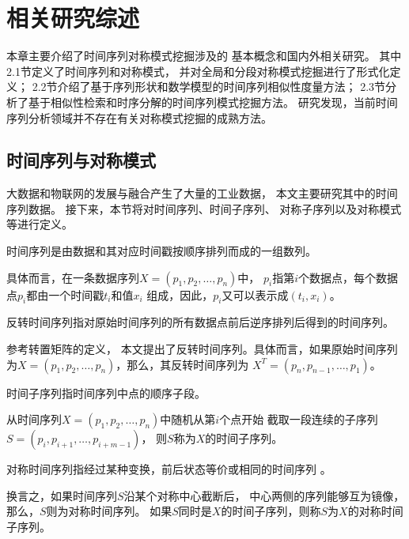 
\chapter{相关研究综述}
本章主要介绍了时间序列对称模式挖掘涉及的
基本概念和国内外相关研究。
其中2.1节定义了时间序列和对称模式，
并对全局和分段对称模式挖掘进行了形式化定义；
2.2节介绍了基于序列形状和数学模型的时间序列相似性度量方法；
2.3节分析了基于相似性检索和时序分解的时间序列模式挖掘方法。
研究发现，当前时间序列分析领域并不存在有关对称模式挖掘的成熟方法。

\section{时间序列与对称模式}
大数据和物联网的发展与融合产生了大量的工业数据，
本文主要研究其中的时间序列数据。
接下来，本节将对时间序列、时间子序列、
对称子序列以及对称模式等进行定义。

\begin{definition}
  时间序列是由数据和其对应时间戳按顺序排列而成的一组数列\cite{DBLP:journals/csur/EslingA12}。

  具体而言，在一条数据序列$X = \left( p_1,p_2,\dots,p_n \right)$中，
  $p_i$指第$i$个数据点，每个数据点$p_i$都由一个时间戳$t_i$和值$x_i$
  组成，因此，$p_i$又可以表示成$\left( t_i,x_i \right)$。
\end{definition}

\begin{definition}
  反转时间序列指对原始时间序列的所有数据点前后逆序排列后得到的时间序列。

  参考转置矩阵的定义\cite{DBLP:conf/vecpar/HishinumaHT16}，
  本文提出了反转时间序列。具体而言，如果原始时间序列
  为$X = \left( p_1,p_2,\dots,p_n \right)$，那么，其反转时间序列为
  $X^T = \left( p_n,p_{n-1},\dots,p_1 \right)$。
\end{definition}

\begin{definition}
  时间子序列指时间序列中点的顺序子段\cite{DBLP:conf/pakdd/LinM10}。

  从时间序列$X=\left( p_1,p_2,\dots,p_n \right)$中随机从第$i$个点开始
  截取一段连续的子序列$S = \left( p_i,p_{i+1},\dots,p_{i+m-1} \right)$，
  则$S$称为$X$的时间子序列。 
\end{definition}

\begin{definition}
  对称时间序列指经过某种变换，前后状态等价或相同的时间序列
  \cite{DBLP:journals/pami/NackmanP85}。

  换言之，如果时间序列$S$沿某个对称中心截断后，
  中心两侧的序列能够互为镜像，那么，$S$则为对称时间序列。
  如果$S$同时是$X$的时间子序列，则称$S$为$X$的对称时间子序列。
\end{definition}

